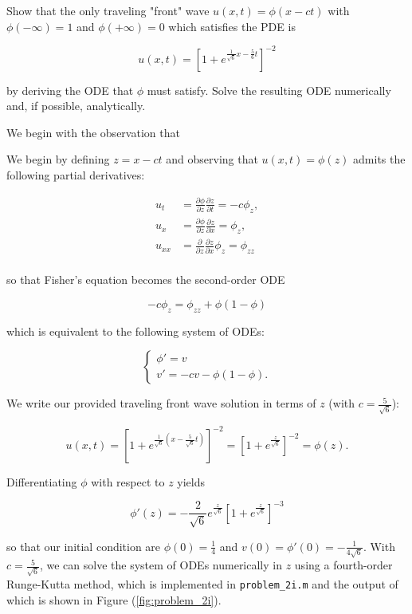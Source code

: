 Show that the only traveling "front" wave $u(x, t) = \phi (x - ct)$ with $\phi(-\infty) = 1$ and $\phi(+\infty) = 0$ 
which satisfies the PDE is

$$
u(x, t) = \left[ 1 + e^{\frac{1}{\sqrt{6}} x - \frac{5}{6} t } \right]^{-2}
$$

by deriving the ODE that $\phi$ must satisfy. Solve the resulting ODE numerically and, if possible, analytically.

\begin{solution}
    We begin with the observation that 



    We begin by defining $z = x - ct$ and observing that $u(x, t) = \phi(z)$ admits the following partial derivatives:

    \begin{align*}
        u_t &= \frac{\partial \phi}{\partial z} \frac{\partial z}{\partial t} = -c \phi_z, \\
        u_x &= \frac{\partial \phi}{\partial z} \frac{\partial z}{\partial x} = \phi_z, \\
        u_{xx} &= \frac{\partial }{\partial z} \frac{\partial z}{\partial x} \phi_z = \phi_{zz} \\
    \end{align*}

    so that Fisher's equation becomes the second-order ODE

    $$
    -c \phi_z = \phi_{zz} + \phi(1 - \phi)
    $$

    which is equivalent to the following system of ODEs:

    $$
        \begin{cases}
        \phi' = v \\
           v' = -c v - \phi(1 - \phi).
        \end{cases}
    $$

    We write our provided traveling front wave solution in terms of $z$ (with $c = \frac{5}{\sqrt{6}}$):

    $$
    u(x, t) = \left[ 1 + e^{\frac{1}{\sqrt{6}} \left(x - \frac{5}{\sqrt{6}} t \right) } \right]^{-2} 
            = \left[ 1 + e^{\frac{z}{\sqrt{6}}} \right]^{-2} 
            = \phi(z).
    $$

    Differentiating $\phi$ with respect to $z$ yields

    $$
    \phi'(z) = -\frac{2}{\sqrt{6}} e^{\frac{z}{\sqrt{6}}} \left[ 1 + e^{\frac{z}{\sqrt{6}}} \right]^{-3} 
    $$

    so that our initial condition are $\phi(0) = \frac{1}{4}$ and $v(0) = \phi'(0) = -\frac{1}{4 \sqrt{6}}$. With 
    $c = \frac{5}{\sqrt{6}}$, we can solve the system of ODEs numerically in $z$ using a fourth-order Runge-Kutta 
    method, which is implemented in \texttt{problem\_2i.m} and the output of which is shown in Figure 
    (\ref{fig:problem_2i}).


\end{solution}
